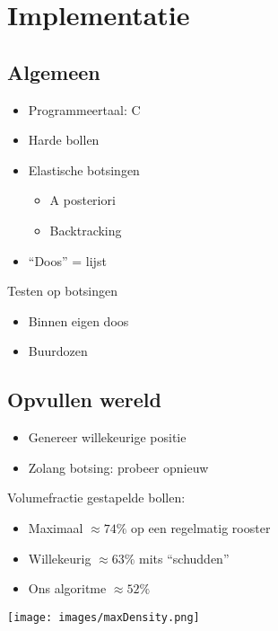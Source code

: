 \documentclass{beamer}
\begin{document}
\section{Implementatie}
\subsection{Algemeen}
\begin{frame}
\begin{itemize}
\item Programmeertaal: C
\item Harde bollen
\item Elastische botsingen
	\begin{itemize}
	\item A posteriori
	\item Backtracking
	\end{itemize}
\item ``Doos'' = lijst
\end{itemize}
Testen op botsingen
\begin{itemize}
\item Binnen eigen doos
\item Buurdozen
\end{itemize}
\end{frame}

\subsection{Opvullen wereld}
\begin{frame}
\begin{itemize}
\item Genereer willekeurige positie
\item Zolang botsing: probeer opnieuw
\end{itemize}

Volumefractie gestapelde bollen:
\begin{itemize}
\item Maximaal $\approx74\%$ op een regelmatig rooster
\item Willekeurig $\approx63\%$ mits ``schudden''
\item Ons algoritme $\approx52\%$
\end{itemize}
\begin{center}
\scalebox{0.45}{
	
}
\texttt{[image: images/maxDensity.png]}
\end{center}
\end{frame}
\end{document}
